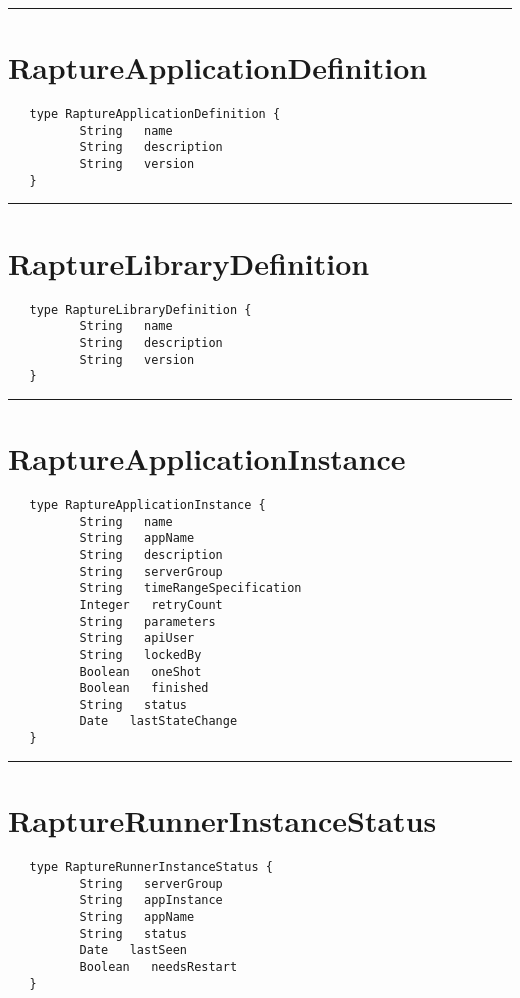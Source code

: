 \rule{15cm}{2pt}
\section{RaptureApplicationDefinition}
\label{type:RaptureApplicationDefinition}

\begin{verbatim}
   type RaptureApplicationDefinition {
          String   name
          String   description
          String   version
   }
\end{verbatim}

\rule{15cm}{2pt}
\section{RaptureLibraryDefinition}
\label{type:RaptureLibraryDefinition}

\begin{verbatim}
   type RaptureLibraryDefinition {
          String   name
          String   description
          String   version
   }
\end{verbatim}

\rule{15cm}{2pt}
\section{RaptureApplicationInstance}
\label{type:RaptureApplicationInstance}

\begin{verbatim}
   type RaptureApplicationInstance {
          String   name
          String   appName
          String   description
          String   serverGroup
          String   timeRangeSpecification
          Integer   retryCount
          String   parameters
          String   apiUser
          String   lockedBy
          Boolean   oneShot
          Boolean   finished
          String   status
          Date   lastStateChange
   }
\end{verbatim}

\rule{15cm}{2pt}
\section{RaptureRunnerInstanceStatus}
\label{type:RaptureRunnerInstanceStatus}

\begin{verbatim}
   type RaptureRunnerInstanceStatus {
          String   serverGroup
          String   appInstance
          String   appName
          String   status
          Date   lastSeen
          Boolean   needsRestart
   }
\end{verbatim}

